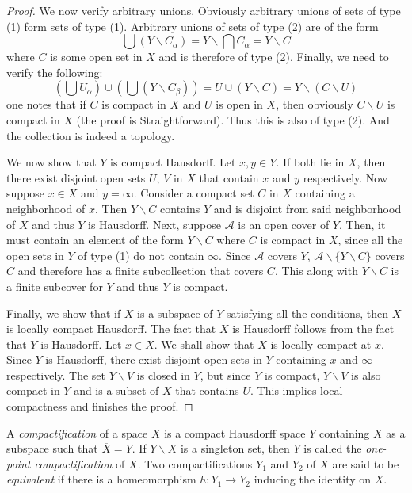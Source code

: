\begin{proof}
    We now verify arbitrary unions. Obviously arbitrary unions of sets of type (1) form sets of type (1). Arbitrary unions of sets of type (2) are of the form 
    \begin{equation*}
        \bigcup\left(Y\backslash C_\alpha\right) = Y\backslash\bigcap C_\alpha = Y\backslash C
    \end{equation*}
    where $C$ is some open set in $X$ and is therefore of type (2). Finally, we need to verify the following:
    \begin{equation*}
        \left(\bigcup U_\alpha\right)\cup\left(\bigcup\left(Y\backslash C_\beta\right)\right) = U\cup\left(Y\backslash C\right) = Y\backslash(C\backslash U)
    \end{equation*}
    one notes that if $C$ is compact in $X$ and $U$ is open in $X$, then obviously $C\backslash U$ is compact in $X$ (the proof is Straightforward). Thus this is also of type (2). And the collection is indeed a topology.

    We now show that $Y$ is compact Hausdorff. Let $x,y\in Y$. If both lie in $X$, then there exist disjoint open sets $U$, $V$ in $X$ that contain $x$ and $y$ respectively. Now suppose $x\in X$ and $y =\infty$. Consider a compact set $C$ in $X$ containing a neighborhood of $x$. Then $Y\backslash C$ contains $Y$ and is disjoint from said neighborhood of $X$ and thus $Y$ is Hausdorff. Next, suppose $\mathscr{A}$ is an open cover of $Y$. Then, it must contain an element of the form $Y\backslash C$ where $C$ is compact in $X$, since all the open sets in $Y$ of type (1) do not contain $\infty$. Since $\mathscr{A}$ covers $Y$, $\mathscr{A}\backslash\{Y\backslash C\}$ covers $C$ and therefore has a finite subcollection that covers $C$. This along with $Y\backslash C$ is a finite subcover for $Y$ and thus $Y$ is compact.
    
    Finally, we show that if $X$ is a subspace of $Y$ satisfying all the conditions, then $X$ is locally compact Hausdorff. The fact that $X$ is Hausdorff follows from the fact that $Y$ is Hausdorff. Let $x\in X$. We shall show that $X$ is locally compact at $x$. Since $Y$ is Hausdorff, there exist disjoint open sets in $Y$ containing $x$ and $\infty$ respectively. The set $Y\backslash V$ is closed in $Y$, but since $Y$ is compact, $Y\backslash V$ is also compact in $Y$ and is a subset of $X$ that contains $U$. This implies local compactness and finishes the proof.
\end{proof}

\begin{definition}[Compactification]
    A \textit{compactification} of a space $X$ is a compact Hausdorff space $Y$ containing $X$ as a subspace such that $\overline{X} = Y$. If $Y\backslash X$ is a singleton set, then $Y$ is called the \textit{one-point compactification} of $X$. Two compactifications $Y_1$ and $Y_2$ of $X$ are said to be \textit{equivalent} if there is a homeomorphism $h: Y_1\to Y_2$ inducing the identity on $X$.
\end{definition}